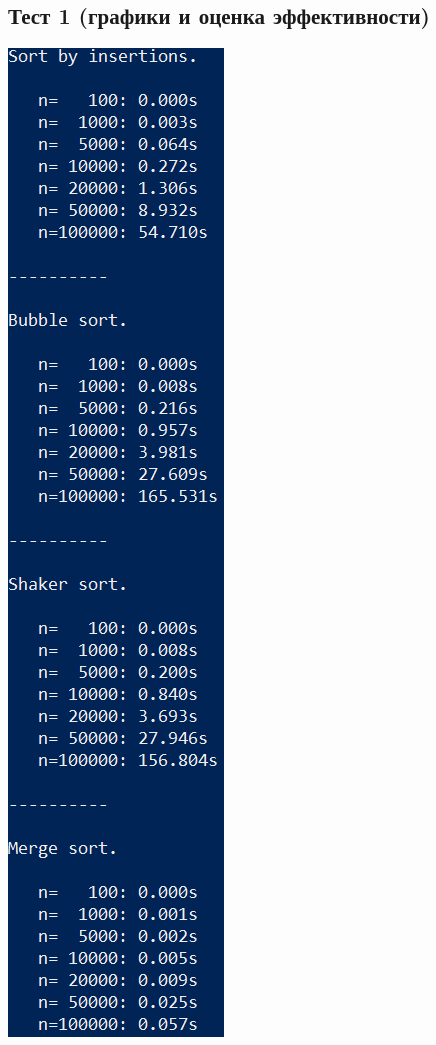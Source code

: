 \documentclass[12pt]{article}
\begin{document}
	\subsection{Тест 1 (графики и оценка эффективности)}
	\includegraphics[width=0.25\linewidth]{tests.png}
\end{document}
